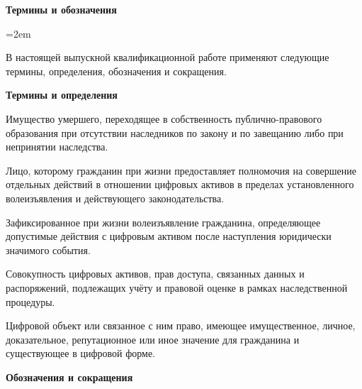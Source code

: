 \newpage
\begin{center}
  \textbf{\large Термины и обозначения}
\end{center}
\begingroup
\emergencystretch=2em

В настоящей выпускной квалификационной работе применяют следующие термины, определения, обозначения и сокращения.

\textbf{Термины и определения}

\begin{description}[leftmargin=5.2cm, style=nextline, font=\normalfont]
  \item[Выморочное имущество] Имущество умершего, переходящее в собственность публично-правового образования при отсутствии наследников по закону и по завещанию либо при непринятии наследства.
  \item[Доверенное лицо] Лицо, которому гражданин при жизни предоставляет полномочия на совершение отдельных действий в отношении цифровых активов в пределах установленного волеизъявления и действующего законодательства.
  \item[Посмертное распоряжение] Зафиксированное при жизни волеизъявление гражданина, определяющее допустимые действия с цифровым активом после наступления юридически значимого события.
  \item[Цифровое наследство] Совокупность цифровых активов, прав доступа, связанных данных и распоряжений, подлежащих учёту и правовой оценке в рамках наследственной процедуры.
  \item[Цифровой актив] Цифровой объект или связанное с ним право, имеющее имущественное, личное, доказательное, репутационное или иное значение для гражданина и существующее в цифровой форме.
\end{description}

\textbf{Обозначения и сокращения}

